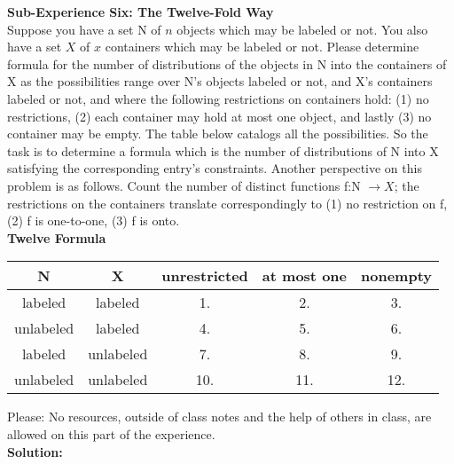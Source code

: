 \documentclass[10pt,a4paper]{report}
\begin{document}
	\textbf{Sub-Experience Six: The Twelve-Fold Way}\\
	Suppose you have a set N of $n$ objects which may be labeled or not.  You also have a set $X$ of $x$ containers which may be labeled or not.  Please determine formula for the number of distributions of the objects in N into the containers of X as the possibilities range over N's objects labeled or not, and X's containers labeled or not, and where the following restrictions on containers hold:  (1) no restrictions,  (2) each container may hold at most one object, and lastly (3) no container may be empty.  The table below catalogs all the possibilities.  So the task is to determine a formula which is the number of distributions of N into X satisfying the corresponding entry's constraints.  Another perspective on this problem is as follows.  Count the number of distinct functions f:N $\rightarrow X$; the restrictions on the containers translate correspondingly to (1) no restriction on f, (2) f is one-to-one, (3) f is onto.\\
	\newline
	\textbf{Twelve Formula}\\
	\begin{center}
		\begin{tabular}{c|c||c|c|c}
			\hline
			N&X&unrestricted&at most one&nonempty\\
			\hline
			labeled&labeled&1.&2.&3.\\
			unlabeled&labeled&4.&5.&6.\\
			labeled&unlabeled&7.&8.&9.\\
			unlabeled&unlabeled&10.&11.&12.\\
			\hline
			\end{tabular}
	\end{center}
	Please: No resources, outside of class notes and the help of others in class, are allowed on this part of the experience.\\
	\newline
	\textbf{Solution: }\\
	\newline
\end{document}

